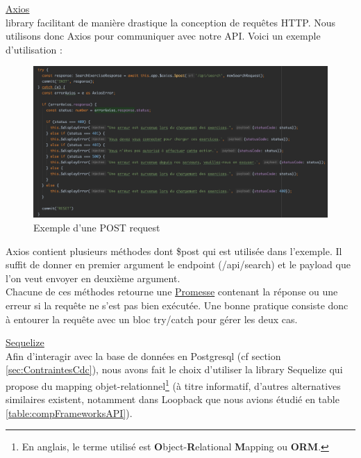 \noindent\underline{\href{https://axios.nuxtjs.org/}{Axios}}\\

\Gls{library} facilitant de manière drastique la conception de requêtes HTTP. Nous utilisons donc Axios pour communiquer avec notre API. Voici un exemple d'utilisation : \\

\begin{figure}[H]
    \includegraphics[width=\textwidth,height=0.35\textheight,keepaspectratio]{images/libraries/axios.png}
    \centering
    \caption[Axios : Exemple d'utilisation]{Exemple d'une POST request}
\end{figure}

Axios contient plusieurs méthodes dont \$post qui est utilisée dans l'exemple. Il suffit de donner en premier argument le endpoint (/api/search) et le payload que l'on veut envoyer en deuxième argument.\\

Chacune de ces méthodes retourne une \href{https://developer.mozilla.org/fr/docs/Web/JavaScript/Guide/Utiliser_les_promesses}{Promesse} contenant la réponse ou une erreur si la requête ne s'est pas bien exécutée. Une bonne pratique consiste donc à entourer la requête avec un bloc try/catch pour gérer les deux cas.\\

\vspace*{.7in}

\noindent\underline{\href{https://sequelize.org/master/}{Sequelize}}\\

Afin d'interagir avec la base de données en Postgresql (cf section \ref{sec:ContraintesCdc}), nous avons fait le choix d'utiliser la \gls{library} Sequelize qui propose du mapping objet-relationnel\footnote{
    En anglais, le terme utilisé est \textbf{O}bject-\textbf{R}elational \textbf{M}apping ou \textbf{ORM}.
} (à titre informatif, d'autres alternatives similaires existent, notamment dans Loopback que nous avions étudié en table \ref{table:compFrameworksAPI}).\\

